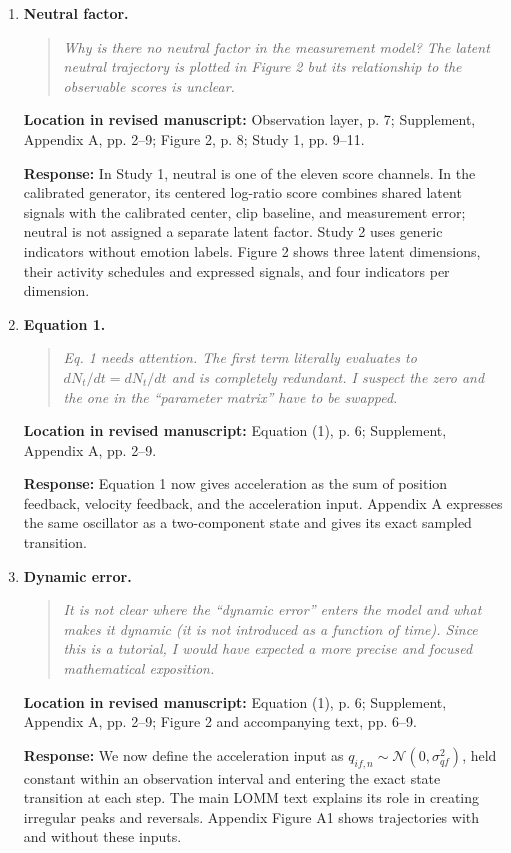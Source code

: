 \documentclass[11pt]{article}
\newenvironment{reviewquote}{\begin{quote}\small\itshape}{\end{quote}}
\newcommand{\point}[1]{\textbf{#1.}}
\newcommand{\location}[1]{\textbf{Location in revised manuscript:} #1\par}
\newcommand{\response}{\textbf{Response:} }
\begin{document}
\begin{enumerate}
  \item \point{Neutral factor}
  \begin{reviewquote}
  Why is there no neutral factor in the measurement model? The latent neutral trajectory is plotted in Figure 2 but its relationship to the observable scores is unclear.
  \end{reviewquote}
  \location{Observation layer, p. 7; Supplement, Appendix A, pp. 2--9; Figure 2, p. 8; Study 1, pp. 9--11.}
  \response In Study 1, neutral is one of the eleven score channels. In the calibrated generator, its centered log-ratio score combines shared latent signals with the calibrated center, clip baseline, and measurement error; neutral is not assigned a separate latent factor. Study 2 uses generic indicators without emotion labels. Figure 2 shows three latent dimensions, their activity schedules and expressed signals, and four indicators per dimension.

  \item \point{Equation 1}
  \begin{reviewquote}
  Eq. 1 needs attention. The first term literally evaluates to \(dN_t/dt = dN_t/dt\) and is completely redundant. I suspect the zero and the one in the ``parameter matrix'' have to be swapped.
  \end{reviewquote}
  \location{Equation (1), p. 6; Supplement, Appendix A, pp. 2--9.}
  \response Equation 1 now gives acceleration as the sum of position feedback, velocity feedback, and the acceleration input. Appendix A expresses the same oscillator as a two-component state and gives its exact sampled transition.

  \item \point{Dynamic error}
  \begin{reviewquote}
  It is not clear where the ``dynamic error'' enters the model and what makes it dynamic (it is not introduced as a function of time). Since this is a tutorial, I would have expected a more precise and focused mathematical exposition.
  \end{reviewquote}
  \location{Equation (1), p. 6; Supplement, Appendix A, pp. 2--9; Figure 2 and accompanying text, pp. 6--9.}
  \response We now define the acceleration input as \(q_{if,n}\sim\mathcal{N}(0,\sigma_{qf}^{2})\), held constant within an observation interval and entering the exact state transition at each step. The main LOMM text explains its role in creating irregular peaks and reversals. Appendix Figure A1 shows trajectories with and without these inputs.


\end{enumerate}
\end{document}
